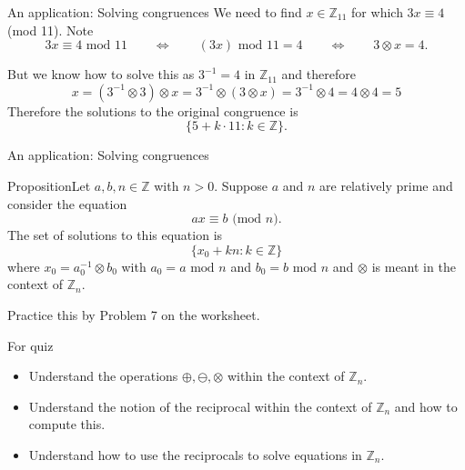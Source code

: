 \documentclass{beamer}
\def\bl[#1]#2{\begin{block}{#1}#2\end{block}}
\def\itemb{\begin{itemize}}
\def\iteme{\end{itemize}}
\begin{document}
\begin{frame}{An application: Solving congruences}
We need to find $x\in\mathbb{Z}_{11}$ for which $3x\equiv 4$ (mod 11). Note
\[
3x\equiv 4\textrm{ mod $11$}\qquad\Leftrightarrow\qquad (3x)\textrm{ mod }11=4\qquad\Leftrightarrow\qquad 3\otimes x=4.
\]

But we know how to solve this as $3^{-1}=4$ in $\mathbb{Z}_{11}$ and therefore
\[
x=(3^{-1}\otimes 3)\otimes x=3^{-1}\otimes(3\otimes x)=3^{-1}\otimes 4=4\otimes 4=5
\]
Therefore the solutions to the original congruence is
\[
\{5+k\cdot 11: k\in\mathbb{Z}\}.
\]
\end{frame}

\begin{frame}{An application: Solving congruences}
\bl[Proposition]{Let $a,b,n\in\mathbb{Z}$ with $n>0$. Suppose $a$ and $n$ are relatively prime and consider the equation
\[
ax\equiv b\textrm{ (mod $n$)}.
\]
The set of solutions to this equation is
\[
\{x_0+kn:k\in\mathbb{Z}\}
\]
where $x_0=a_0^{-1}\otimes b_0$ with $a_0=a\textrm{ mod }n$ and $b_0=b\textrm{ mod }n$ and $\otimes$ is meant in the context of $\mathbb{Z}_n$.}

Practice this by Problem 7 on the worksheet.
\end{frame}

\begin{frame}{For quiz}
\itemb
\item Understand the operations $\oplus,\ominus,\otimes$ within the context of $\mathbb{Z}_n$.
\item Understand the notion of the reciprocal within the context of $\mathbb{Z}_n$ and how to compute this.
\item Understand how to use the reciprocals to solve equations in $\mathbb{Z}_n$.
\iteme
\end{frame}
\end{document}
